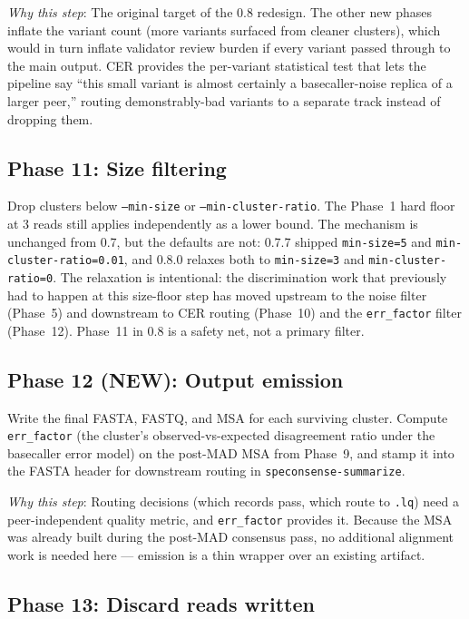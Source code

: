 \documentclass[11pt]{article}
\begin{document}
\emph{Why this step}: The original target of the 0.8 redesign. The other new
phases inflate the variant count (more variants surfaced from cleaner
clusters), which would in turn inflate validator review burden if every
variant passed through to the main output. CER provides the per-variant
statistical test that lets the pipeline say ``this small variant is almost
certainly a basecaller-noise replica of a larger peer,'' routing
demonstrably-bad variants to a separate track instead of dropping them.

\subsection*{Phase 11: Size filtering}

Drop clusters below \texttt{--min-size} or \texttt{--min-cluster-ratio}.
The Phase~1 hard floor at 3 reads still applies independently as a lower
bound. The mechanism is unchanged from 0.7, but the defaults are not: 0.7.7
shipped \texttt{min-size=5} and \texttt{min-cluster-ratio=0.01}, and 0.8.0
relaxes both to \texttt{min-size=3} and \texttt{min-cluster-ratio=0}. The
relaxation is intentional: the discrimination work that previously had to
happen at this size-floor step has moved upstream to the noise filter
(Phase~5) and downstream to CER routing (Phase~10) and the
\texttt{err\_factor} filter (Phase~12). Phase~11 in 0.8 is a safety net,
not a primary filter.

\subsection*{Phase 12 (NEW): Output emission}

Write the final FASTA, FASTQ, and MSA for each surviving cluster. Compute
\texttt{err\_factor} (the cluster's observed-vs-expected disagreement
ratio under the basecaller error model) on the post-MAD MSA from
Phase~9, and stamp it into the FASTA header for downstream routing in
\texttt{speconsense-summarize}.

\emph{Why this step}: Routing decisions (which records pass, which route
to \texttt{.lq}) need a peer-independent quality metric, and
\texttt{err\_factor} provides it. Because the MSA was already built
during the post-MAD consensus pass, no additional alignment work is
needed here --- emission is a thin wrapper over an existing artifact.

\subsection*{Phase 13: Discard reads written}
\end{document}
